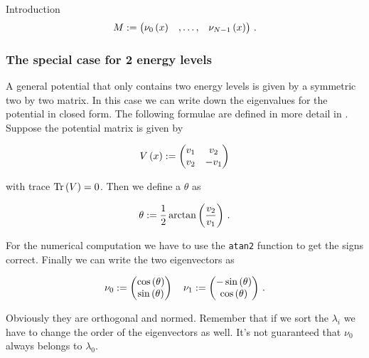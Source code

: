 \begin{chapter}{Introduction}
\begin{equation} \label{eq:general_transformation_matirx}
  M :=
  \begin{pmatrix}
    \nu_0\left( x \right) & , \hdots , & \nu_{N-1}\left( x \right)
  \end{pmatrix} \,.
\end{equation}

\subsubsection{The special case for 2 energy levels}

A general potential that only contains two energy levels is given by a symmetric
two by two matrix. In this case we can write down the eigenvalues for the potential
in closed form. The following formulae are defined in more detail in \cite{H_T_semiclassical_2x2}.
Suppose the potential matrix is given by

\begin{equation}
  V\left( x \right) :=
  \begin{pmatrix}
    v_1 &  v_2 \\
    v_2 & -v_1
  \end{pmatrix}
\end{equation}

with trace $\text{Tr}\left( V \right) = 0$. Then we define a $\theta$ as

\begin{equation}
  \theta := \frac{1}{2} \arctan \left( \frac{v_2}{v_1} \right) \,.
\end{equation}

For the numerical computation we have to use the \texttt{atan2} function to get
the signs correct. Finally we can write the two eigenvectors as

\begin{equation}
  \nu_0 :=
  \begin{pmatrix}
    \cos\left( \theta \right) \\
    \sin\left( \theta \right)
  \end{pmatrix}
  \quad
  \nu_1 :=
  \begin{pmatrix}
    -\sin\left( \theta \right) \\
    \cos\left( \theta \right)
  \end{pmatrix} \,.
\end{equation}

Obviously they are orthogonal and normed. Remember that if we sort the $\lambda_i$
we have to change the order of the eigenvectors
as well. It's not guaranteed that $\nu_0$ always belongs to $\lambda_0$.


\end{chapter}
